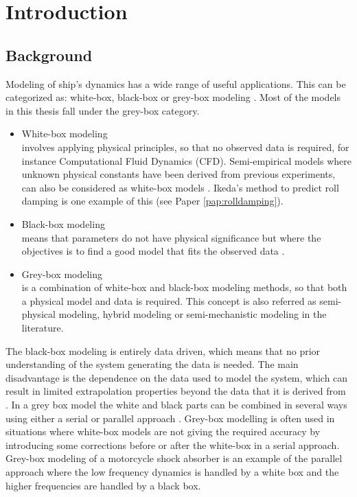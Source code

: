 \chapter{Introduction}
\section{Background}
Modeling of ship’s dynamics has a wide range of useful applications. This can be categorized as: white-box, black-box or grey-box modeling \cite{leifsson_grey-box_2008}. Most of the models in this thesis fall under the grey-box category.

\begin{itemize}
    \item White-box modeling \\
    involves applying physical principles, so that no observed data is required, for instance Computational Fluid Dynamics (CFD). Semi-empirical models where unknown physical constants have been derived from previous experiments, can also be considered as white-box models \cite{leifsson_grey-box_2008}. Ikeda's method to predict roll damping \cite{ikeda_components_1978} is one example of this (see Paper \ref{pap:rolldamping}).  

    \item Black-box modeling \\
    means that parameters do not have physical significance but where the objectives is to find a good model that fits the observed data \cite{lindskog_tools_1995}.
    
    \item Grey-box modeling \\
    is a combination of white-box and black-box modeling methods, so that both a physical model and data is required. This concept is also referred as semi-physical modeling, hybrid modeling or semi-mechanistic modeling \cite{leifsson_grey-box_2008} in the literature. 
\end{itemize}

\noindent The black-box modeling is entirely data driven, which means that no prior understanding of the system generating the data is needed. The main disadvantage is the dependence on the data used to model the system, which can result in limited extrapolation properties beyond the data that it is derived from \cite{leifsson_grey-box_2008}. 
In a grey box model the white and black parts can be combined in several ways using either a serial or parallel approach \cite{leifsson_grey-box_2008}. 
Grey-box modelling is often used in situations where white-box models are not giving the required accuracy by introducing some corrections before or after the white-box in a serial approach. 
Grey-box modeling of a motorcycle shock absorber \cite{beghi_grey-box_2007} is an example of the parallel approach where the low frequency dynamics is handled by a white box and the higher frequencies are handled by a black box.

